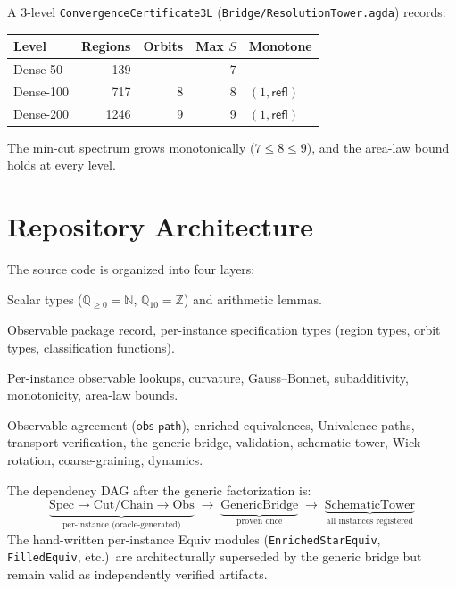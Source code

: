 \documentclass[11pt, a4paper]{article}
\theoremstyle{plain}
\theoremstyle{definition}
\newcommand{\refl}{\mathsf{refl}}
\newcommand{\Qgeq}{\mathbb{Q}_{\geq 0}}
\newcommand{\Qten}{\mathbb{Q}_{10}}
\newcommand{\NN}{\mathbb{N}}
\newcommand{\ZZ}{\mathbb{Z}}
\begin{document}
A 3-level \texttt{ConvergenceCertificate3L}
(\texttt{Bridge/ResolutionTower.agda}) records:
\begin{center}
\begin{tabular}{@{}lrrrl@{}}
\toprule
\textbf{Level} & \textbf{Regions} & \textbf{Orbits} &
\textbf{Max $S$} & \textbf{Monotone} \\
\midrule
Dense-50  & 139  & ---  & 7 & --- \\
Dense-100 & 717  &   8 & 8 & $(1,\refl)$ \\
Dense-200 & 1246 &   9 & 9 & $(1,\refl)$ \\
\bottomrule
\end{tabular}
\end{center}
The min-cut spectrum grows monotonically ($7 \leq 8 \leq 9$),
and the area-law bound holds at every level.

\section{Repository Architecture}
\label{sec:repo}

The source code is organized into four layers:

\begin{description}[style=nextline,nosep]
  \item[\texttt{Util/}] Scalar types ($\Qgeq = \NN$,
    $\Qten = \ZZ$) and arithmetic lemmas.
  \item[\texttt{Common/}] Observable package record, per-instance
    specification types (region types, orbit types, classification
    functions).
  \item[\texttt{Boundary/} and \texttt{Bulk/}] Per-instance
    observable lookups, curvature, Gauss--Bonnet, subadditivity,
    monotonicity, area-law bounds.
  \item[\texttt{Bridge/}] Observable agreement
    ($\mathsf{obs\text{-}path}$), enriched equivalences, Univalence
    paths, transport verification, the generic bridge, validation,
    schematic tower, Wick rotation, coarse-graining, dynamics.
\end{description}

The dependency DAG after the generic factorization is:
\[
  \underbrace{\text{Spec} \to \text{Cut/Chain} \to \text{Obs}}_{\text{per-instance (oracle-generated)}}
  \;\longrightarrow\;
  \underbrace{\text{GenericBridge}}_{\text{proven once}}
  \;\longrightarrow\;
  \underbrace{\text{SchematicTower}}_{\text{all instances registered}}
\]
The hand-written per-instance Equiv modules
(\texttt{EnrichedStarEquiv}, \texttt{FilledEquiv}, etc.)\ are
architecturally superseded by the generic bridge but remain valid
as independently verified artifacts.
\end{document}
